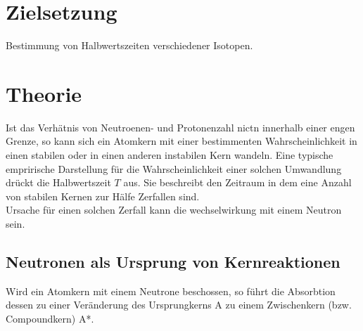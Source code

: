 \newpage
\section*{Zielsetzung}
Bestimmung von Halbwertszeiten verschiedener Isotopen.
\section{Theorie}
Ist das Verhätnis von Neutroenen- und Protonenzahl nictn innerhalb einer engen Grenze, so kann sich
ein Atomkern mit einer bestimmenten Wahrscheinlichkeit in einen stabilen oder in einen anderen
instabilen Kern wandeln. Eine typische emprirische Darstellung für die Wahrscheinlichkeit einer
solchen Umwandlung drückt die Halbwertszeit $T$ aus. Sie beschreibt den Zeitraum in dem eine Anzahl von stabilen Kernen
zur Hälfe Zerfallen sind.\\
Ursache für einen solchen Zerfall kann die wechselwirkung mit einem Neutron sein.
\subsection{Neutronen als Ursprung von Kernreaktionen}
Wird ein Atomkern mit einem Neutrone beschossen, so führt die Absorbtion dessen zu einer Veränderung
des Ursprungkerns A zu einem Zwischenkern (bzw. Compoundkern) A*.
